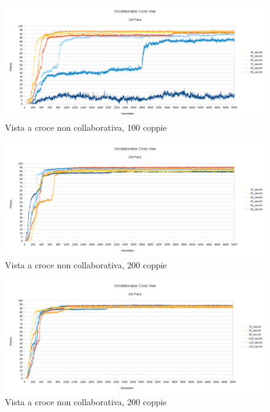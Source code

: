 \begin{figure}[ht]
	\centering
	\includegraphics[scale=0.7,angle=90]{imgs/uncollaborative_cross_100_pairs_40_90_vecchi.png}
	\caption{Vista a croce non collaborativa, 100 coppie}
	\label{figure:uncoll_cross_100_40_90}
\end{figure}
\begin{figure}[ht]
	\centering
	\includegraphics[scale=0.7,angle=90]{imgs/uncollaborative_cross_200_pairs_10_60_vecchi.png}
	\caption{Vista a croce non collaborativa, 200 coppie}
	\label{figure:uncoll_cross_200_10_60}
\end{figure}
\begin{figure}[ht]
	\centering
	\includegraphics[scale=0.7,angle=90]{imgs/uncollaborative_cross_200_pairs_70_120_vecchi.png}
	\caption{Vista a croce non collaborativa, 200 coppie}
	\label{figure:uncoll_cross_200_70_120}
\end{figure}
